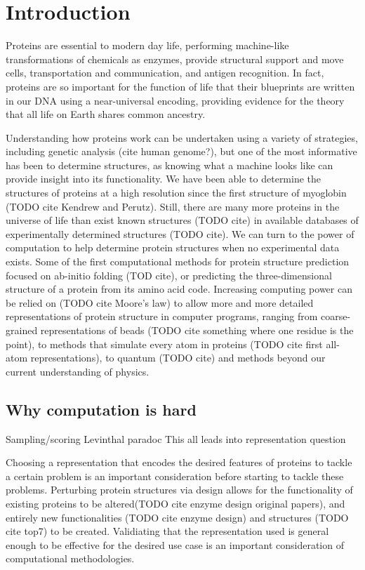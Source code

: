 \chapter{Introduction}

Proteins are essential to modern day life,
performing machine-like transformations of chemicals as enzymes,
provide structural support and move cells,
transportation and communication,
and antigen recognition.
In fact, proteins are so important for the function of life that their blueprints are written in our DNA\cite{avery_studies_1944} using a near-universal encoding\cite{crick_origin_1968,hinegardner_rationale_1963},
providing evidence for the theory that all life on Earth shares common ancestry\cite{darwin_origin_1859}.

Understanding how proteins work can be undertaken using a variety of strategies, including genetic analysis (cite human genome?), but one of the most informative has been to determine structures, as knowing what a machine looks like can provide insight into its functionality.
We have been able to determine the structures of proteins at a high resolution since the first structure of myoglobin (TODO cite Kendrew and Perutz).
Still, there are many more proteins in the universe of life than exist known structures (TODO cite) in available databases of experimentally determined structures (TODO cite).
We can turn to the power of computation to help determine protein structures when no experimental data exists.
Some of the first computational methods for protein structure prediction focused on ab-initio folding (TOD cite), or predicting the three-dimensional structure of a protein from its amino acid code.
Increasing computing power can be relied on (TODO cite Moore's law) to allow more and more detailed representations of protein structure in computer programs, ranging from coarse-grained representations of beads (TODO cite something where one residue is the point), to methods that simulate every atom in proteins (TODO cite first all-atom representations), to quantum (TODO cite) and methods beyond our current understanding of physics.

\section{Why computation is hard}
Sampling/scoring
Levinthal paradoc
This all leads into representation question

Choosing a representation that encodes the desired features of proteins to tackle a certain problem is an important consideration before starting to tackle these problems.
Perturbing protein structures via design allows for the functionality of existing proteins to be altered(TODO cite enzyme design original papers), and entirely new functionalities (TODO cite enzyme design) and structures (TODO cite top7) to be created.
Validiating that the representation used is general enough to be effective for the desired use case is an important consideration of computational methodologies.

